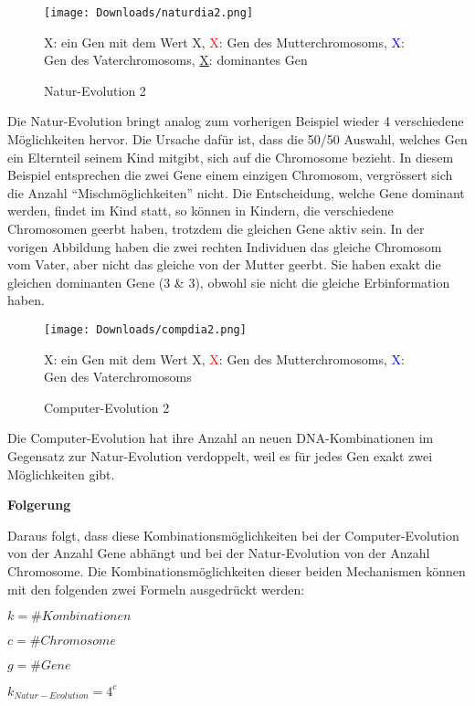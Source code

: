 \documentclass[10pt,a4paper,ngerman,english]{article}
\begin{document}
\begin{figure}[h]
    \centering
    \texttt{[image: Downloads/naturdia2.png]}
    \caption{Natur-Evolution 2}
    \medskip
    \scriptsize
    X: ein Gen mit dem Wert X, \textcolor{red}{X}: Gen des Mutterchromosoms, \textcolor{blue}{X}: Gen des Vaterchromosoms, \underline{X}: dominantes Gen
\end{figure}


Die Natur-Evolution bringt analog zum vorherigen Beispiel wieder 4 verschiedene Möglichkeiten hervor. Die Ursache dafür ist, dass die 50/50 Auswahl, welches Gen ein Elternteil seinem Kind mitgibt, sich auf die Chromosome bezieht. In diesem Beispiel entsprechen die zwei Gene einem einzigen Chromosom, vergrössert sich die Anzahl \enquote{Mischmöglichkeiten} nicht. Die Entscheidung, welche Gene dominant werden, findet im Kind statt, so können in Kindern, die verschiedene Chromosomen geerbt haben, trotzdem die gleichen Gene aktiv sein. In der vorigen Abbildung haben die zwei rechten Individuen das gleiche Chromosom vom Vater, aber nicht das gleiche von der Mutter geerbt. Sie haben exakt die gleichen dominanten Gene (3 \& 3), obwohl sie nicht die gleiche Erbinformation haben.

\begin{figure}[h]
    \centering
    \texttt{[image: Downloads/compdia2.png]}
    \caption{Computer-Evolution 2}
    \medskip
    \scriptsize
    X: ein Gen mit dem Wert X, \textcolor{red}{X}: Gen des Mutterchromosoms, \textcolor{blue}{X}: Gen des Vaterchromosoms
\end{figure}

Die Computer-Evolution hat ihre Anzahl an neuen DNA-Kombinationen im Gegensatz zur Natur-Evolution verdoppelt, weil es für jedes Gen exakt zwei Möglichkeiten gibt.

\bigskip
\bigskip

\textbf{Folgerung}

\bigskip
Daraus folgt, dass diese Kombinationsmöglichkeiten bei der Computer-Evolution von der Anzahl Gene abhängt und bei der Natur-Evolution von der Anzahl Chromosome. Die Kombinationsmöglichkeiten dieser beiden Mechanismen können mit den folgenden zwei Formeln ausgedrückt werden:
\bigskip

\(k=\#Kombinationen\)

\(c=\#Chromosome\)

\(g=\#Gene\)
\bigskip

\(k_{Natur-Evolution}=4^c\)
\bigskip
\end{document}
